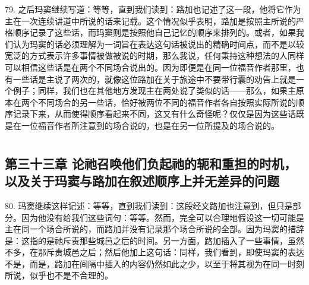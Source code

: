 79. 之后玛窦继续写道：等等，直到我们读到：路加也记述了这一段，他将它作为主在一次连续讲道中所说的话来记载。这个情况似乎表明，路加是按照主所说的严格顺序记录了这些话，而玛窦则是按照他自己记忆的顺序来排列的。或者，如果我们认为玛窦的话必须理解为一词旨在表达这句话被说出的精确时间点，而不是以较宽泛的方式表示许多事情被做被说的时期，那么我说，任何秉持这种想法的人同样可以相信这些话是在两个不同场合说出的。因为即便是在同一位福音作者那里，也有一些话是主说了两次的，就像这位路加在关于旅途中不要带行囊的劝告上就是一个例子；同样，我们也在其他地方发现主在两处说了类似的话——那么，如果主原本在两个不同场合的另一些话，恰好被两位不同的福音作者各自按照实际所说的顺序记录下来，从而使得顺序看起来不同，这又有什么奇怪呢？仅仅是因为这些话既是在一位福音作者所注意到的场合说的，也是在另一位所提及的场合说的。\par



\section{}


\subsection{第三十三章 论祂召唤他们负起祂的轭和重担的时机，以及关于玛窦与路加在叙述顺序上并无差异的问题}

80. 玛窦继续这样记述：等等，直到我们读到：这段经文路加也注意到，但只是部分。因为他没有给我们这些词句：等等。然而，完全可以合理地假设这一切可能是主在同一个场合所说的，而路加并没有记录那个场合所说的全部。因为玛窦的措辞是：这指的是祂斥责那些城邑之后的时间。另一方面，路加插入了一些事情，虽然不多，在那斥责城邑之后；然后他加上这句话：同样，我们看到，即使玛窦的表达不是，而是，路加在间隔中插入的内容仍然如此之少，以至于将其视为在同一时刻所说，似乎也不是不合理的。\par

